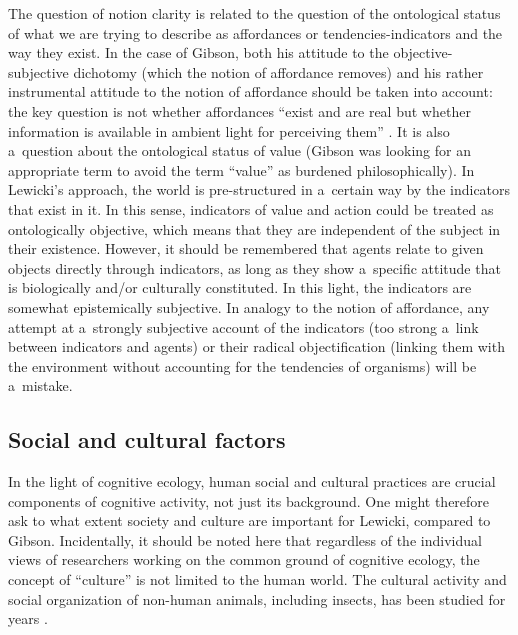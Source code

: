 \documentclass[%
manuscript=article,
year=2024,
volume=77,
doi=10.59203/zfn.77.693,
]{zfn}
\begin{document}
The question of notion clarity is related to the question of the ontological status of what we are trying to describe as affordances or tendencies-indicators and the way they exist. In the case of Gibson, both his attitude to the objective-subjective dichotomy (which the notion of affordance removes) and his rather instrumental attitude to the notion of affordance should be taken into account: the key question is not whether affordances ``exist and are real but whether information is available in ambient light for perceiving them'' 
\parencite[][p.140]{gibson_ecological_1979}. %
 It is also a~question about the ontological status of value (Gibson was looking for an appropriate term to avoid the term ``value'' as burdened philosophically). In Lewicki's approach, the world is pre-structured in a~certain way by the indicators that exist in it. In this sense, indicators of value and action could be treated as ontologically objective, which means that they are independent of the subject in their existence. However, it should be remembered that agents relate to given objects directly through indicators, as long as they show a~specific attitude that is biologically and/or culturally constituted. In this light, the indicators are somewhat epistemically subjective. In analogy to the notion of affordance, any attempt at a~strongly subjective account of the indicators (too strong a~link between indicators and agents) or their radical objectification (linking them with the environment without accounting for the tendencies of organisms) will be a~mistake.



\subsection{Social and cultural factors}



In the light of cognitive ecology, human social and cultural practices are crucial components of cognitive activity, not just its background. One might therefore ask to what extent society and culture are important for Lewicki, compared to Gibson. Incidentally, it should be noted here that regardless of the individual views of researchers working on the common ground of cognitive ecology, the concept of ``culture'' is not limited to the human world. The cultural activity and social organization of non-human animals, including insects, has been studied for years 
\parencite[see e.g.,][]{zuk_sex_2011}.%
\end{document}

